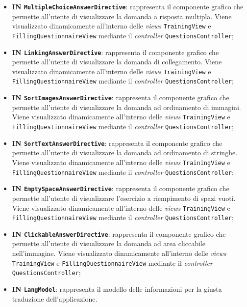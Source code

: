 \begin{itemize}
\begin{itemize}
		\item \textbf{IN \texttt{MultipleChoiceAnswerDirective}}: rappresenta il componente grafico che permette all'utente di visualizzare la domanda a risposta multipla. Viene visualizzato dinamicamente all'interno delle \textit{views} \texttt{TrainingView} e \texttt{FillingQuestionnaireView} mediante il \textit{controller} \texttt{QuestionsController};
		\item \textbf{IN \texttt{LinkingAnswerDirective}}: rappresenta il componente grafico che permette all'utente di visualizzare la domanda di collegamento. Viene visualizzato dinamicamente all'interno delle \textit{views} \texttt{TrainingView} e \texttt{FillingQuestionnaireView} mediante il \textit{controller} \texttt{QuestionsController};
		\item \textbf{IN \texttt{SortImagesAnswerDirective}}: rappresenta il componente grafico che permette all'utente di visualizzare la domanda ad ordinamento di immagini. Viene visualizzato dinamicamente all'interno delle \textit{views} \texttt{TrainingView} e \texttt{FillingQuestionnaireView} mediante il \textit{controller} \texttt{QuestionsController};
		\item \textbf{IN \texttt{SortTextAnswerDirective}}: rappresenta il componente grafico che permette all'utente di visualizzare la domanda ad ordinamento di stringhe. Viene visualizzato dinamicamente all'interno delle \textit{views} \texttt{TrainingView} e \texttt{FillingQuestionnaireView} mediante il \textit{controller} \texttt{QuestionsController};
		\item \textbf{IN \texttt{EmptySpaceAnswerDirective}}: rappresenta il componente grafico che permette all'utente di visualizzare l'esercizio a riempimento di spazi vuoti. Viene visualizzato dinamicamente all'interno delle \textit{views} \texttt{TrainingView} e \texttt{FillingQuestionnaireView} mediante il \textit{controller} \texttt{QuestionsController};
		\item \textbf{IN \texttt{ClickableAnswerDirective}}: rappresenta il componente grafico che permette all'utente di visualizzare la domanda ad area cliccabile nell'immagine. Viene visualizzato dinamicamente all'interno delle \textit{views} \texttt{TrainingView} e \texttt{FillingQuestionnaireView} mediante il \textit{controller} \texttt{QuestionsController};
		\item \textbf{IN \texttt{LangModel}}: rappresenta il modello delle informazioni per la giusta traduzione dell'applicazione.

\end{itemize}
\end{itemize}
